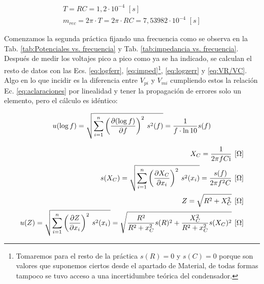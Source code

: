 \documentclass[11pt]{report}
\begin{document}
\begin{refsection}
\begin{center}
\begin{equation}
\begin{split}
    T=RC = 1,2 \cdot 10^{-4} \hspace{4pt}[s]\\
    m_{rec}=2\pi \cdot T=2\pi \cdot R C= 7,53982 \cdot 10^{-4} \hspace{4pt}[s]
    \label{eq:ctetiempo}
\end{split}
\end{equation}
\end{center}
Comenzamos la segunda práctica fijando una frecuencia como se observa en la Tab. \ref{tab:Potenciales vs. frecuencia} y 
Tab. \ref{tab:impedancia vs. frecuencia}. Después de
medir los voltajes pico a pico como ya se ha indicado, se calculan el resto de datos con las Ecs. \ref{eq:logferr},
\ref{eq:imped}\footnote{Tomaremos para el resto de la práctica $s(R)=0$ y $s(C)=0$ porque son valores que suponemos ciertos desde el apartado de Material, de todas formas
tampoco se tuvo acceso a una incertidumbre teórica del condensador.},
\ref{eq:logzerr} y \ref{eq:VR/VC}. Algo en lo que incidir es la diferencia entre $V_{pi}$ y $V_{mi}$ cumpliendo estos la relación Ec.
\ref{eq:aclaraciones} por linealidad y tener la propagación de errores solo un elemento, pero el cálculo es idéntico:

\begin{center}
\begin{equation}
\begin{split}
    u(\log f)=\sqrt{\sum^n_{i=1} \left( \frac{\partial (\log f)}{\partial f} \right)^2\hspace{2 pt} s^2(f)}=
    \frac{1}{f \cdot \ln 10}s(f) \\
    \label{eq:logferr}
\end{split}
\end{equation}

\begin{equation}
\begin{split}
    X_C=\frac{1}{2\pi f C\complexnum{i}} \hspace{4pt} [\Omega]\\
    s(X_C)=\sqrt{\sum^n_{i=1} \left( \frac{\partial X_C}{\partial x_i} \right)^2\hspace{2 pt} s^2(x_i)}=
    \frac{s(f)}{2\pi f^2 C} \hspace{4pt} [\Omega]\\
    Z = \sqrt{R^2+X^2_C} \hspace{4pt} [\Omega] \\
    u(Z)=\sqrt{\sum^n_{i=1} \left( \frac{\partial Z}{\partial x_i} \right)^2\hspace{2 pt} s^2(x_i)}=
    \sqrt{\frac{R^2}{R^2+x^2_C}s(R)^2+\frac{X_C^2}{R^2+x^2_C}s(X_C)^2}
    \hspace{4pt}[\Omega]
    \label{eq:imped}
\end{split}
\end{equation}


\end{center}
\end{refsection}
\end{document}
